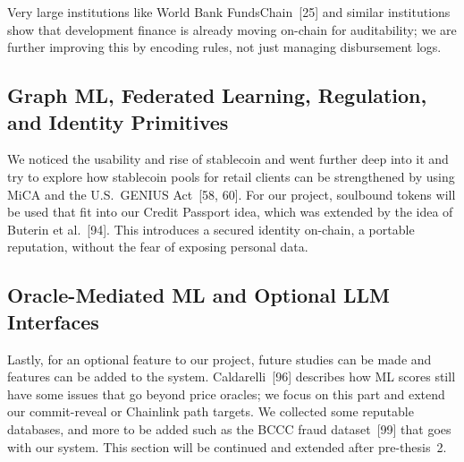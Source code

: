 Very large institutions like World Bank FundsChain~[25] and similar institutions show that development finance is already moving on-chain for auditability; we are further improving this by encoding rules, not just managing disbursement logs.

\subsection{Graph ML, Federated Learning, Regulation, and Identity Primitives}

We noticed the usability and rise of stablecoin and went further deep into it and try to explore how stablecoin pools for retail clients can be strengthened by using MiCA and the U.S.\ GENIUS Act~[58, 60]. For our project, soulbound tokens will be used that fit into our Credit Passport idea, which was extended by the idea of Buterin et al.~[94]. This introduces a secured identity on-chain, a portable reputation, without the fear of exposing personal data.

\subsection{Oracle-Mediated ML and Optional LLM Interfaces}
\label{sec:lit-llm}

Lastly, for an optional feature to our project, future studies can be made and features can be added to the system. Caldarelli~[96] describes how ML scores still have some issues that go beyond price oracles; we focus on this part and extend our commit-reveal or Chainlink path targets. We collected some reputable databases, and more to be added such as the BCCC fraud dataset~[99] that goes with our system. This section will be continued and extended after pre-thesis~2.

